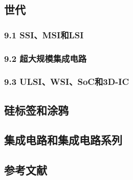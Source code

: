 \subsection{世代}



\subsubsection{9.1 SSI、MSI和LSI}



\subsubsection{9.2 超大规模集成电路}



\subsubsection{9.3 ULSI、WSI、SoC和3D-IC}



\subsection{硅标签和涂鸦}



\subsection{集成电路和集成电路系列}



\subsection{参考文献}